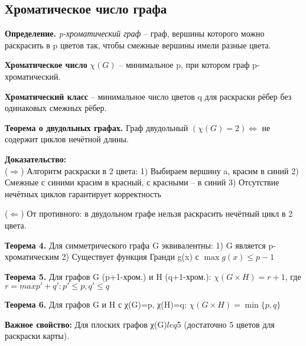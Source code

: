 \subsection{Хроматическое число графа}

\noindent\textbf{Определение.} \textit{p-хроматический граф} -- граф, вершины которого можно раскрасить в p цветов так, чтобы смежные вершины имели разные цвета.

\noindent\textbf{Хроматическое число} $\chi(G)$ -- минимальное p, при котором граф p-хроматический.

\noindent\textbf{Хроматический класс} -- минимальное число цветов q для раскраски рёбер без одинаковых смежных рёбер.

\noindent\textbf{Теорема о двудольных графах.} Граф двудольный $(χ(G)=2) \Longleftrightarrow$ не содержит циклов нечётной длины.

\noindent\textbf{Доказательство:}\\
($\Rightarrow$) Алгоритм раскраски в 2 цвета:
1) Выбираем вершину a, красим в синий
2) Смежные с синими красим в красный, с красными -- в синий
3) Отсутствие нечётных циклов гарантирует корректность
 
($\Leftarrow$) От противного: в двудольном графе нельзя раскрасить нечётный цикл в 2 цвета.

\noindent\textbf{Теорема 4.} Для симметрического графа G эквивалентны:
1) G является p-хроматическим
2) Существует функция Гранди g(x) с $\max g(x) \leq p-1$

\noindent\textbf{Теорема 5.} Для графов G (p+1-хром.) и H (q+1-хром.):
$\chi(G \times H) = r+1$, где $r = max{p'+q': p'\leq p, q'\leq q}$

\noindent\textbf{Теорема 6.} Для графов G и H с χ(G)=p, χ(H)=q:
$\chi(G \times H) = \min\{p,q\}$

\noindent\textbf{Важное свойство:} Для плоских графов χ(G)$leq$5 (достаточно 5 цветов для раскраски карты).